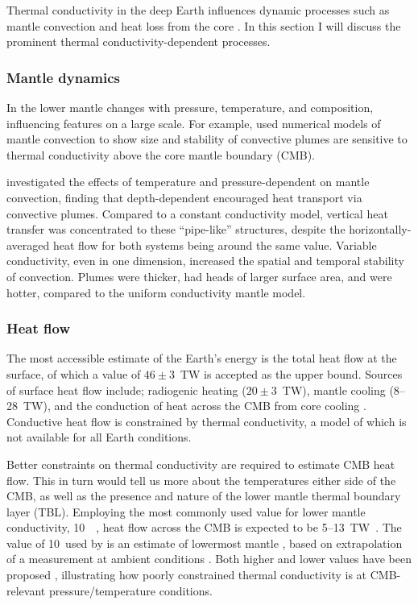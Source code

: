 Thermal conductivity in the deep Earth influences dynamic processes such as mantle convection and heat loss from the core \citep{Lay2008}. In this section I will discuss the prominent thermal conductivity-dependent processes.

\subsubsection{Mantle dynamics}

In the lower mantle \tcs changes with pressure, temperature, and composition, influencing features on a large scale. For example, \citet{Naliboff2006} used numerical models of mantle convection to show size and stability of convective plumes are sensitive to thermal conductivity above the core mantle boundary (CMB).

\citet{Dubuffet2000} investigated the effects of temperature and pressure-dependent \tcs on mantle convection, finding that depth-dependent \tcs encouraged heat transport via convective plumes. Compared to a constant conductivity model, vertical heat transfer was concentrated to these ``pipe-like'' structures, despite the horizontally-averaged heat flow for both systems being around the same value. Variable conductivity, even in one dimension, increased the spatial and temporal stability of convection. Plumes were thicker, had heads of larger surface area, and were hotter, compared to the uniform conductivity mantle model.

\subsubsection{Heat flow}

The most accessible estimate of the Earth's energy is the total heat flow at the surface, of which a value of $46\pm3$~TW is accepted as the upper bound. Sources of surface heat flow include; radiogenic heating ($20\pm3$~TW), mantle cooling (8--28~TW), and the conduction of heat across the CMB from core cooling \citep{Lay2008}. Conductive heat flow is constrained by thermal conductivity, a model of which is not available for all Earth conditions.

Better constraints on thermal conductivity are required to estimate CMB heat flow. This in turn would tell us more about the temperatures either side of the CMB, as well as the presence and nature of the lower mantle thermal boundary layer (TBL). Employing the most commonly used value for lower mantle conductivity, 10~\wmk~\citep{Lay2008}, heat flow across the CMB is expected to be 5--13~TW~\citep{Lay2008}. The value of 10~\wmks used by \citet{Lay2006} is an estimate of lowermost mantle \tc, based on extrapolation of a measurement at ambient conditions \citep{Osako1991}. Both higher and lower values have been proposed \citep[4--16~\wmk,][]{Manthilake2011}, illustrating how poorly constrained thermal conductivity is at CMB-relevant pressure/temperature conditions.

